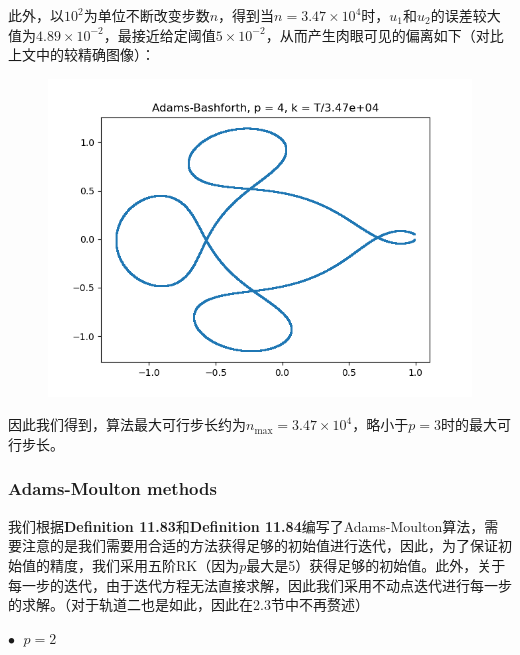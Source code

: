 \documentclass{ctexart}
\begin{document}
\begin{sloppypar}
此外，以$10^2$为单位不断改变步数$n$，得到当$n = 3.47 \times 10^4$时，$u_1$和$u_2$的误差较大值为$4.89 \times 10^{-2}$，最接近给定阈值$5 \times 10^{-2}$，从而产生肉眼可见的偏离如下（对比上文中的较精确图像）：
\begin{figure}[H]
\centering
\includegraphics[scale = 0.45]{./report_src/Figure_8.png}
\end{figure}
因此我们得到，算法最大可行步长约为$n_{\max} = 3.47 \times 10^4$，略小于$p=3$时的最大可行步长。

\subsubsection{Adams-Moulton methods}
我们根据\textbf{Definition 11.83}和\textbf{Definition 11.84}编写了Adams-Moulton算法，需要注意的是我们需要用合适的方法获得足够的初始值进行迭代，因此，为了保证初始值的精度，我们采用五阶RK（因为$p$最大是5）获得足够的初始值。此外，关于每一步的迭代，由于迭代方程无法直接求解，因此我们采用不动点迭代进行每一步的求解。（对于轨道二也是如此，因此在2.3节中不再赘述）

$\bullet \;$ $p = 2$


\end{sloppypar}
\end{document}
